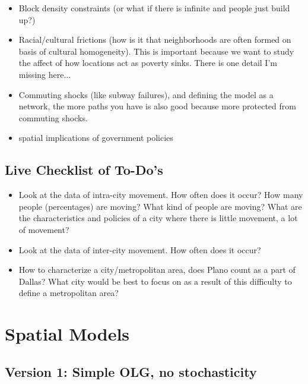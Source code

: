 \documentclass[11pt,english]{article}
\begin{document}
\begin{itemize}
\item Block density constraints (or what if there is infinite and people just build up?)

\item Racial/cultural frictions (how is it that neighborhoods are often formed on basis of cultural homogeneity). This is important because we want to study the affect of how locations act as poverty sinks. There is one detail I'm missing here...

\item Commuting shocks (like subway failures), and defining the model as a network, the more paths you have is also good because more protected from commuting shocks.

\item spatial implications of government policies

\end{itemize}

\subsection{Live Checklist of To-Do's}

\begin{itemize}
\item Look at the data of intra-city movement. How often does it occur? How many people (percentages) are moving? What kind of people are moving? What are the characteristics and policies of a city where there is little movement, a lot of movement?

\item Look at the data of inter-city movement. How often does it occur?

\item How to characterize a city/metropolitan area, does Plano count as a part of Dallas? What city would be best to focus on as a result of this difficulty to define a metropolitan area?

\end{itemize}


\section{Spatial Models}

\subsection{Version 1: Simple OLG, no stochasticity}
\end{document}
